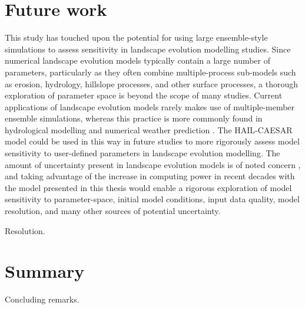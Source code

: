 \section{Future work}
This study has touched upon the potential for using large ensemble-style simulations to assess sensitivity in landscape evolution modelling studies. Since numerical landscape evolution models typically contain a large number of parameters, particularly as they often combine multiple-process sub-models such as erosion, hydrology, hillslope processes, and other surface processes, a thorough exploration of parameter space is beyond the scope of many studies. Current applications of landscape evolution models rarely makes use of multiple-member ensemble simulations, whereas this practice is more commonly found in hydrological modelling \citep{cloke2009ensemble,wong2015sensitivity} and numerical weather prediction \citep{sivillo1997ensemble}. The HAIL-CAESAR model could be used in this way in future studies to more rigorously assess model sensitivity to user-defined parameters in landscape evolution modelling. The amount of uncertainty present in landscape evolution models is of noted concern \citep{pelletier2015forecasting}, and taking advantage of the increase in computing power in recent decades with the model presented in this thesis would enable a rigorous exploration of model sensitivity to parameter-space, initial model conditions, input data quality, model resolution, and many other sources of potential uncertainty.

Resolution.

\section{Summary}
Concluding remarks.
